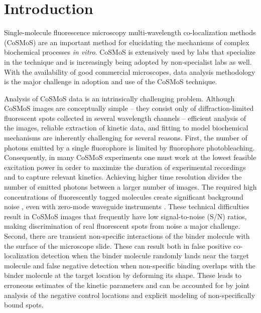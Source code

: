 \section{Introduction}

Single-molecule fluorescence microscopy multi-wavelength co-localization methods (CoSMoS) are an important method for elucidating the mechanisms of complex biochemical processes \textit{in vitro}. CoSMoS is extensively used by labs that specialize in the technique and is increasingly being adopted by non-specialist labs as well. With the availability of good commercial microscopes, data analysis methodology is the major challenge in adoption and use of the CoSMoS technique.

Analysis of CoSMoS data is an intrinsically challenging problem. Although CoSMoS images are conceptually simple -- they consist only of diffraction-limited fluorescent spots collected in several wavelength channels -- efficient analysis of the images, reliable extraction of kinetic data, and fitting to model biochemical mechanisms are inherently challenging for several reasons. First, the number of photons emitted by a single fluorophore is limited by fluorophore photobleaching. Consequently, in many CoSMoS experiments one must work at the lowest feasible excitation power in order to maximize the duration of experimental recordings and to capture relevant kinetics. Achieving higher time resolution divides the number of emitted photons between a larger number of images. The required high concentrations of fluorescently tagged molecules create significant background noise \citep{Peng2018-ge,Van_Oijen2011-ig}, even with zero-mode waveguide instruments \citep{chen_high-throughput_2014}. These technical difficulties result in CoSMoS images that frequently have low signal-to-noise (S/N) ratios, making discrimination of real fluorescent spots from noise a major challenge. Second, there are transient non-specific interactions of the binder molecule with the surface of the microscope slide. These can result both in false positive co-localization detection when the binder molecule randomly lands near the target molecule and false negative detection when non-specific binding overlaps with the binder molecule at the target location by deforming its shape. These leads to erroneous estimates of the kinetic parameters and can be accounted for by joint analysis of the negative control locations and explicit modeling of non-specifically bound spots.


